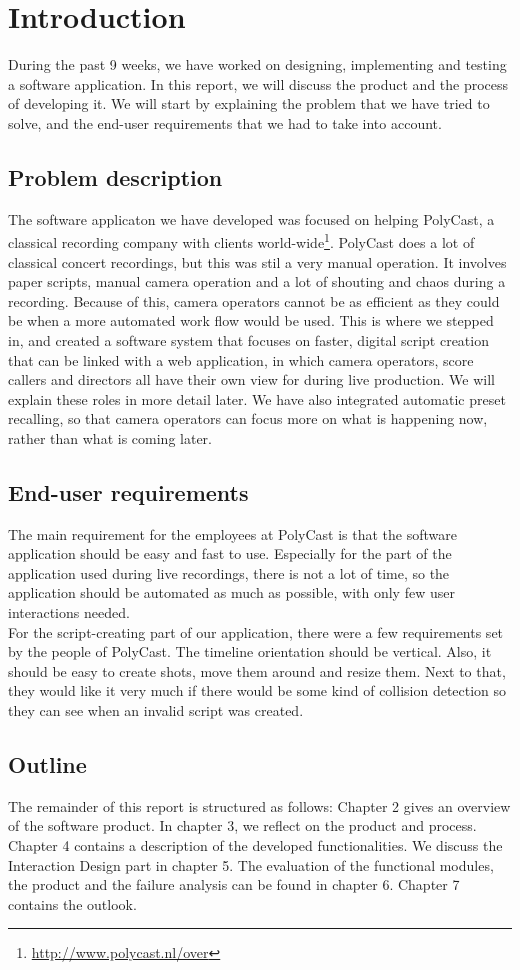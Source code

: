 \section{Introduction}

During the past 9 weeks, we have worked on designing, implementing and testing a software application. In this report, we will discuss the product and the process of developing it. We will start by explaining the problem that we have tried to solve, and the end-user requirements that we had to take into account.

\subsection{Problem description}
The software applicaton we have developed was focused on helping PolyCast, a classical recording company with clients world-wide\footnote{\url{http://www.polycast.nl/over}}. PolyCast does a lot of classical concert recordings, but this was stil a very manual operation. It involves paper scripts, manual camera operation and a lot of shouting and chaos during a recording. Because of this, camera operators cannot be as efficient as they could be when a more automated work flow would be used. This is where we stepped in, and created a software system that focuses on faster, digital script creation that can be linked with a web application, in which camera operators, score callers and directors all have their own view for during live production. We will explain these roles in more detail later. We have also integrated automatic preset recalling, so that camera operators can focus more on what is happening now, rather than what is coming later.

\subsection{End-user requirements}
The main requirement for the employees at PolyCast is that the software application should be easy and fast to use. Especially for the part of the application used during live recordings, there is not a lot of time, so the application should be automated as much as possible, with only few user interactions needed.\\
For the script-creating part of our application, there were a few requirements set by the people of PolyCast. The timeline orientation should be vertical. Also, it should be easy to create shots, move them around and resize them. Next to that, they would like it very much if there would be some kind of collision detection so they can see when an invalid script was created.

\subsection{Outline}
The remainder of this report is structured as follows: Chapter 2 gives an overview of the software product. In chapter 3, we reflect on the product and process. Chapter 4 contains a description of the developed functionalities. We discuss the Interaction Design part in chapter 5. The evaluation of the functional modules, the product and the failure analysis can be found in chapter 6. Chapter 7 contains the outlook.